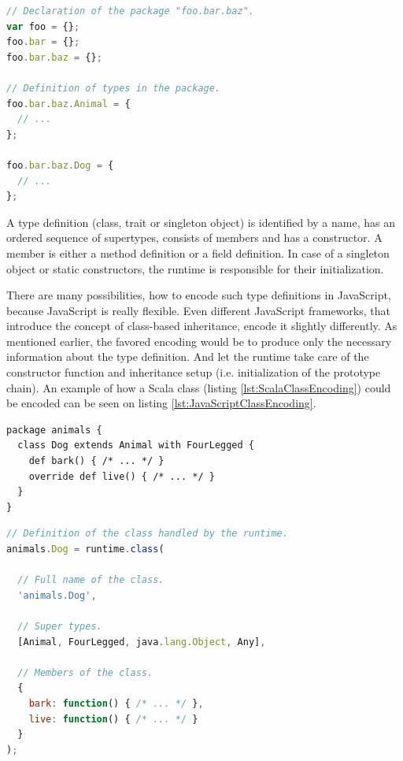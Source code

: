 \documentclass[12pt,a4paper]{report}
\begin{document}
\begin{lstlisting}[language=JavaScript,frame=single,caption={Packages in JavaScript.},label={lst:JavaScriptPackages}]
// Declaration of the package "foo.bar.baz".
var foo = {};
foo.bar = {};
foo.bar.baz = {};

// Definition of types in the package.
foo.bar.baz.Animal = {
  // ...
};

foo.bar.baz.Dog = {
  // ...
};
\end{lstlisting}

A type definition (class, trait or singleton object) is identified by a name, has an ordered sequence of supertypes, consists of members and has a constructor. A member is either a method definition or a field definition. In case of a singleton object or static constructors, the runtime is responsible for their initialization.

There are many possibilities, how to encode such type definitions in JavaScript, because JavaScript is really flexible. Even different JavaScript frameworks, that introduce the concept of class-based inheritance, encode it slightly differently. As mentioned earlier, the favored encoding would be to produce only the necessary information about the type definition. And let the runtime take care of the constructor function and inheritance setup (i.e. initialization of the prototype chain). An example of how a Scala class (listing \ref{lst:ScalaClassEncoding}) could be encoded can be seen on listing \ref{lst:JavaScriptClassEncoding}.

\begin{lstlisting}[frame=single,caption={Scala class example.},label={lst:ScalaClassEncoding}]
package animals {
  class Dog extends Animal with FourLegged {
    def bark() { /* ... */ }
    override def live() { /* ... */ }
  }
}
\end{lstlisting}

\begin{lstlisting}[language=JavaScript,frame=single,caption={Class in JavaScript.},label={lst:JavaScriptClassEncoding}]
// Definition of the class handled by the runtime.
animals.Dog = runtime.class(
  
  // Full name of the class.
  'animals.Dog',
	
  // Super types.
  [Animal, FourLegged, java.lang.Object, Any],
	
  // Members of the class.
  {
    bark: function() { /* ... */ },
    live: function() { /* ... */ }
  }
);
\end{lstlisting}
\end{document}
